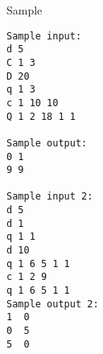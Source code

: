 Sample
\begin{verbatim}
Sample input: 
d 5 
C 1 3 
D 20 
q 1 3 
c 1 10 10 
Q 1 2 18 1 1 

Sample output: 
0 1 
9 9  

Sample input 2:
d 5
d 1
q 1 1
d 10
q 1 6 5 1 1
c 1 2 9
q 1 6 5 1 1
Sample output 2:
1  0
0  5
5  0
\end{verbatim}